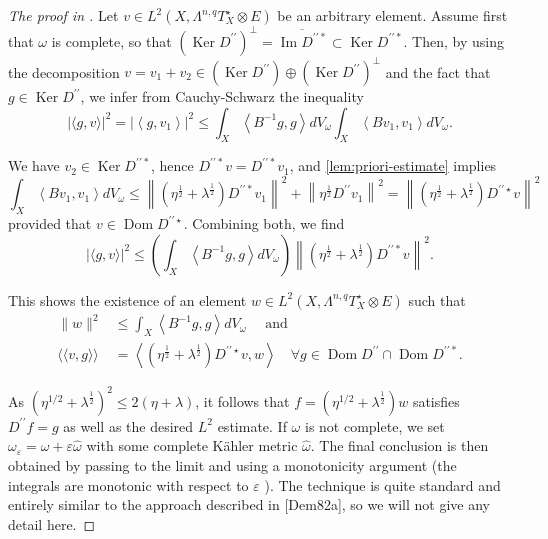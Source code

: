 \documentclass[lang=en,12pt]{beautybook}
\begin{document}
\begin{proof}[The proof in \cite{Demailly2000}]
  Let $v \in L^2\left(X, \Lambda^{n, q} T_X^{\star} \otimes E\right)$ be an arbitrary element. Assume first that $\omega$ is complete, so that $\left(\operatorname{Ker} D^{\prime \prime}\right)^{\perp}=\overline{\operatorname{Im} D^{\prime \prime *}} \subset \operatorname{Ker} D^{\prime \prime *}$. Then, by using the decomposition $v=v_1+v_2 \in\left(\operatorname{Ker} D^{\prime \prime}\right) \oplus\left(\operatorname{Ker} D^{\prime \prime}\right)^{\perp}$ and the fact that $g \in \operatorname{Ker} D^{\prime \prime}$, we infer from Cauchy-Schwarz the inequality
$$
|\langle g, v\rangle|^2=\left|\left\langle g, v_1\right\rangle\right|^2 \leqslant \int_X\left\langle B^{-1} g, g\right\rangle d V_\omega \int_X\left\langle B v_1, v_1\right\rangle d V_\omega .
$$

We have $v_2 \in \operatorname{Ker} D^{\prime \prime *}$, hence $D^{\prime \prime *} v=D^{\prime \prime *} v_1$, and \autoref{lem:priori-estimate} implies
$$
\int_X\left\langle B v_1, v_1\right\rangle d V_\omega \leqslant\left\|\left(\eta^{\frac{1}{2}}+\lambda^{\frac{1}{2}}\right) D^{\prime \prime *} v_1\right\|^2+\left\|\eta^{\frac{1}{2}} D^{\prime \prime} v_1\right\|^2=\left\|\left(\eta^{\frac{1}{2}}+\lambda^{\frac{1}{2}}\right) D^{\prime \prime \star} v\right\|^2
$$
provided that $v \in \operatorname{Dom} D^{\prime \prime \star}$. Combining both, we find
$$
|\langle g, v\rangle|^2 \leqslant\left(\int_X\left\langle B^{-1} g, g\right\rangle d V_\omega\right)\left\|\left(\eta^{\frac{1}{2}}+\lambda^{\frac{1}{2}}\right) D^{\prime \prime *} v\right\|^2 .
$$

This shows the existence of an element $w \in L^2\left(X, \Lambda^{n, q} T_X^{\star} \otimes E\right)$ such that
$$
\begin{aligned}
\|w\|^2 & \leqslant \int_X\left\langle B^{-1} g, g\right\rangle d V_\omega \quad \text { and } \\
\langle\langle v, g\rangle\rangle & =\left\langle\left(\eta^{\frac{1}{2}}+\lambda^{\frac{1}{2}}\right) D^{\prime \prime \star} v, w\right\rangle \quad \forall g \in \operatorname{Dom} D^{\prime \prime} \cap \operatorname{Dom} D^{\prime \prime *} .
\end{aligned}
$$

As $\left(\eta^{1 / 2}+\lambda^{\frac{1}{2}}\right)^2 \leqslant 2(\eta+\lambda)$, it follows that $f=\left(\eta^{1 / 2}+\lambda^{\frac{1}{2}}\right) w$ satisfies $D^{\prime \prime} f=g$ as well as the desired $L^2$ estimate. If $\omega$ is not complete, we set $\omega_{\varepsilon}=\omega+\varepsilon \widehat{\omega}$ with some complete Kähler metric $\widehat{\omega}$. The final conclusion is then obtained by passing to the limit and using a monotonicity argument (the integrals are monotonic with respect to $\varepsilon$ ). The technique is quite standard and entirely similar to the approach described in [Dem82a], so we will not give any detail here.
\end{proof}
\end{document}
